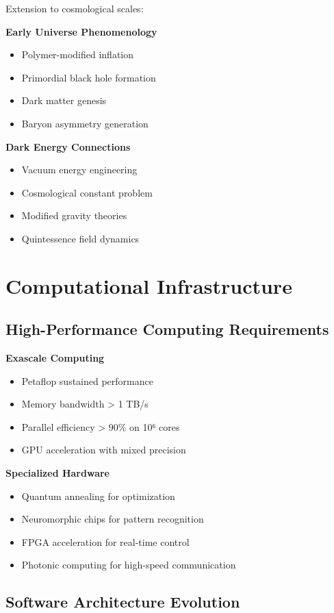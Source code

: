 \documentclass[11pt]{article}
\begin{document}
Extension to cosmological scales:

\textbf{Early Universe Phenomenology}
\begin{itemize}
\item Polymer-modified inflation
\item Primordial black hole formation
\item Dark matter genesis
\item Baryon asymmetry generation
\end{itemize}

\textbf{Dark Energy Connections}
\begin{itemize}
\item Vacuum energy engineering
\item Cosmological constant problem
\item Modified gravity theories
\item Quintessence field dynamics
\end{itemize}

\section{Computational Infrastructure}

\subsection{High-Performance Computing Requirements}

\textbf{Exascale Computing}
\begin{itemize}
\item Petaflop sustained performance
\item Memory bandwidth > 1 TB/s
\item Parallel efficiency > 90\% on 10⁶ cores
\item GPU acceleration with mixed precision
\end{itemize}

\textbf{Specialized Hardware}
\begin{itemize}
\item Quantum annealing for optimization
\item Neuromorphic chips for pattern recognition
\item FPGA acceleration for real-time control
\item Photonic computing for high-speed communication
\end{itemize}

\subsection{Software Architecture Evolution}
\end{document}
